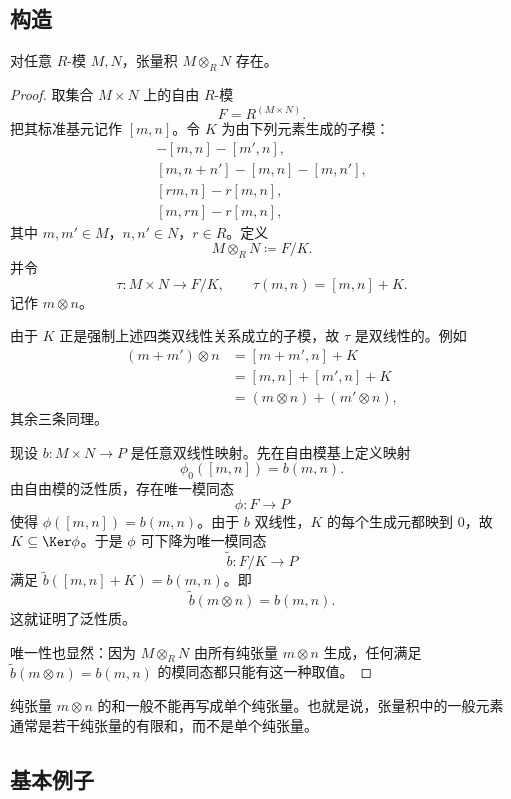 \subsection{构造}

\begin{theorem}
对任意 $R$-模 $M,N$，张量积 $M\otimes_R N$ 存在。
\end{theorem}

\begin{proof}
取集合 $M\times N$ 上的自由 $R$-模
\[
F=R^{(M\times N)}.
\]
把其标准基元记作 $[m,n]$。令 $K$ 为由下列元素生成的子模：
\begin{align*}
[m+m',n]-[m,n]-[m',n],\\
[m,n+n']-[m,n]-[m,n'],\\
[rm,n]-r[m,n],\\
[m,rn]-r[m,n],
\end{align*}
其中 $m,m'\in M$，$n,n'\in N$，$r\in R$。定义
\[
M\otimes_R N\coloneqq F/K.
\]
并令
\[
\tau\colon M\times N\to F/K,
\qquad
\tau(m,n)=[m,n]+K.
\]
记作 $m\otimes n$。

由于 $K$ 正是强制上述四类双线性关系成立的子模，故 $\tau$ 是双线性的。例如
\begin{align*}
(m+m')\otimes n
&=[m+m',n]+K\\
&=[m,n]+[m',n]+K\\
&=(m\otimes n)+(m'\otimes n),
\end{align*}
其余三条同理。

现设 $b\colon M\times N\to P$ 是任意双线性映射。先在自由模基上定义映射
\[
\phi_0([m,n])=b(m,n).
\]
由自由模的泛性质，存在唯一模同态
\[
\phi\colon F\to P
\]
使得 $\phi([m,n])=b(m,n)$。由于 $b$ 双线性，$K$ 的每个生成元都映到 $0$，故 $K\subseteq \Ker\phi$。于是 $\phi$ 可下降为唯一模同态
\[
\widetilde b\colon F/K\to P
\]
满足 $\widetilde b([m,n]+K)=b(m,n)$。即
\[
\widetilde b(m\otimes n)=b(m,n).
\]
这就证明了泛性质。

唯一性也显然：因为 $M\otimes_R N$ 由所有纯张量 $m\otimes n$ 生成，任何满足 $\widetilde b(m\otimes n)=b(m,n)$ 的模同态都只能有这一种取值。
\end{proof}

\begin{remark}
纯张量 $m\otimes n$ 的和一般不能再写成单个纯张量。也就是说，张量积中的一般元素通常是若干纯张量的有限和，而不是单个纯张量。
\end{remark}

\subsection{基本例子}

